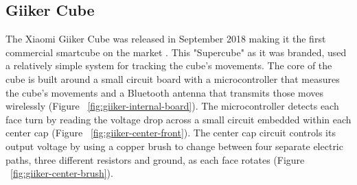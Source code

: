 \subsection{Giiker Cube}

The Xiaomi Giiker Cube was released in September 2018 making it the
first commercial smartcube on the market \cite{giiker-thecubicle}. This
"Supercube" as it was branded, used a relatively simple system for
tracking the cube's movements. The core of the cube is built around a
small circuit board with a microcontroller that measures the cube's
movements and a Bluetooth antenna that transmits those moves wirelessly
(Figure ~\ref{fig:giiker-internal-board}). The microcontroller detects
each face turn by reading the voltage drop across a small circuit
embedded within each center cap (Figure
~\ref{fig:giiker-center-front}). The center cap circuit controls its
output voltage by using a copper brush to change between four separate
electric paths, three different resistors and ground, as each face
rotates (Figure ~\ref{fig:giiker-center-brush}).
\cite{giiker-internals}

